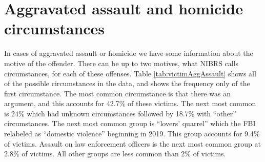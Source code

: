 \documentclass[
  12pt,
  openany]{book}
\begin{document}
\section{Aggravated assault and homicide circumstances}\label{aggravated-assault-and-homicide-circumstances}

In cases of aggravated assault or homicide we have some information about the motive of the offender. There can be up to two motives, what NIBRS calls circumstances, for each of these offenses. Table \ref{tab:victimAggAssault} shows all of the possible circumstances in the data, and shows the frequency only of the first circumstance. The most common circumstance is that there was an argument, and this accounts for 42.7\% of these victims. The next most common is 24\% which had unknown circumstances followed by 18.7\% with ``other'' circumstances. The next most common group is ``lovers' quarrel'' which the FBI relabeled as ``domestic violence'' beginning in 2019. This group accounts for 9.4\% of victims. Assault on law enforcement officers is the next most common group at 2.8\% of victims. All other groups are less common than 2\% of victims.
\end{document}
